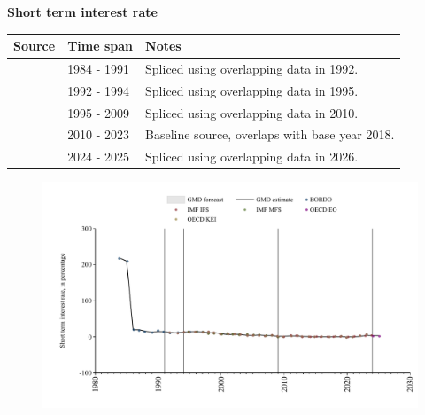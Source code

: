 \documentclass[12pt,a4paper,landscape]{article}
\begin{document}
\begin{adjustbox}{max totalsize={\paperwidth}{\paperheight},center}
\begin{minipage}[t][\textheight][t]{\textwidth}
\vspace*{0.5cm}
{}
\begin{center}
{\Large\bfseries Short term interest rate}
\end{center}
\vspace{0.5cm}
\begin{table}[H]
\centering
\small
\begin{tabular}{|l|l|l|}
\hline
\textbf{Source} & \textbf{Time span} & \textbf{Notes} \\
\hline
\rowcolor{white}\cite{BORDO}& 1984 - 1991 &Spliced using overlapping data in 1992. \\
\rowcolor{lightgray}\cite{OECD_KEI}& 1992 - 1994 &Spliced using overlapping data in 1995. \\
\rowcolor{white}\cite{IMF_MFS}& 1995 - 2009 &Spliced using overlapping data in 2010. \\
\rowcolor{lightgray}\cite{OECD_KEI}& 2010 - 2023 &Baseline source, overlaps with base year 2018. \\
\rowcolor{white}\cite{OECD_EO}& 2024 - 2025 &Spliced using overlapping data in 2026. \\
\hline
\end{tabular}
\end{table}
\begin{figure}[H]
\centering
\includegraphics[width=\textwidth,height=0.6\textheight,keepaspectratio]{graphs/ISR_strate.pdf}
\end{figure}
\end{minipage}
\end{adjustbox}
\end{document}
